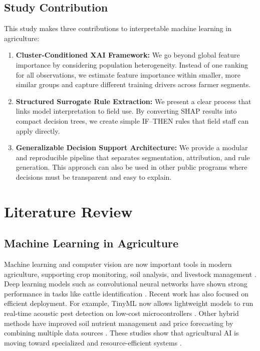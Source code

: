 \documentclass[fleqn,10pt,lineno]{wlpeerj}
\begin{document}
\subsection*{Study Contribution}
This study makes three contributions to interpretable machine learning in agriculture:
\begin{enumerate}
    \item \textbf{Cluster-Conditioned XAI Framework:} We go beyond global feature importance by considering population heterogeneity. Instead of one ranking for all observations, we estimate feature importance within smaller, more similar groups and capture different training drivers across farmer segments.
    \item \textbf{Structured Surrogate Rule Extraction:} We present a clear process that links model interpretation to field use. By converting SHAP results into compact decision trees, we create simple IF--THEN rules that field staff can apply directly.
    \item \textbf{Generalizable Decision Support Architecture:} We provide a modular and reproducible pipeline that separates segmentation, attribution, and rule generation. This approach can also be used in other public programs where decisions must be transparent and easy to explain.
\end{enumerate}

\section{Literature Review}

\subsection{Machine Learning in Agriculture}
Machine learning and computer vision are now important tools in modern agriculture, supporting crop monitoring, soil analysis, and livestock management \citep{liakos2018}. Deep learning models such as convolutional neural networks have shown strong performance in tasks like cattle identification \citep{hossain2022cattle}. Recent work has also focused on efficient deployment. For example, TinyML now allows lightweight models to run real-time acoustic pest detection on low-cost microcontrollers \citep{kazeneza2026}. Other hybrid methods have improved soil nutrient management and price forecasting by combining multiple data sources \citep{ennaji2023nutrient}. These studies show that agricultural AI is moving toward specialized and resource-efficient systems \citep{kamilaris2018}.
\end{document}
